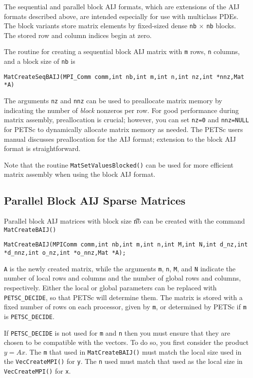 The sequential and parallel block AIJ formats, which are extensions of
the AIJ formats described above, are intended especially for use with
multiclass PDEs.  The block variants store matrix elements by
fixed-sized dense \lstinline{nb} $\times$ \lstinline{nb} blocks.  The stored row
and column indices begin at zero.

The routine for creating a sequential block AIJ matrix with \lstinline{m}
rows, \lstinline{n} columns, and a block size of \lstinline{nb} is
\begin{lstlisting}
MatCreateSeqBAIJ(MPI_Comm comm,int nb,int m,int n,int nz,int *nnz,Mat *A)
\end{lstlisting}
The arguments \lstinline{nz} and \lstinline{nnz} can be used to preallocate matrix
memory by indicating the number of {\em block} nonzeros per row.  For good
performance during matrix assembly, preallocation is crucial; however, you
can set \lstinline{nz=0} and \lstinline{nnz=NULL} for PETSc to dynamically
allocate matrix memory as needed.  The PETSc users manual
discusses preallocation for the AIJ format; extension to the block AIJ
format is straightforward.

Note that the routine \lstinline{MatSetValuesBlocked()}
can be used for more efficient matrix assembly
when using the block AIJ format.

\subsection{Parallel Block AIJ Sparse Matrices}

Parallel block AIJ matrices with block size {\t nb} can be created with
the command \lstinline{MatCreateBAIJ()}
\begin{lstlisting}
MatCreateBAIJ(MPIComm comm,int nb,int m,int n,int M,int N,int d_nz,int *d_nnz,int o_nz,int *o_nnz,Mat *A);
\end{lstlisting}
\lstinline{A} is the newly created matrix, while the arguments \lstinline{m}, \lstinline{n},
\lstinline{M}, and \lstinline{N} indicate the number of local rows and columns and
the number of global rows and columns, respectively. Either the local or
global parameters can be replaced with \lstinline{PETSC_DECIDE}, so that
PETSc will determine them.
The matrix is stored with a fixed number of rows on
each processor, given by \lstinline{m}, or determined by PETSc if \lstinline{m} is
\lstinline{PETSC_DECIDE}.

If \lstinline{PETSC_DECIDE} is not used for
\lstinline{m} and \lstinline{n} then you must ensure that they are chosen to be
compatible with the vectors. To do so, you first consider the product
$y = A x$. The \lstinline{m} that used in \lstinline{MatCreateBAIJ()}
must match the local size used in the \lstinline{VecCreateMPI()} for \lstinline{y}.
The \lstinline{n} used must match that used as the local size in
\lstinline{VecCreateMPI()} for \lstinline{x}.

